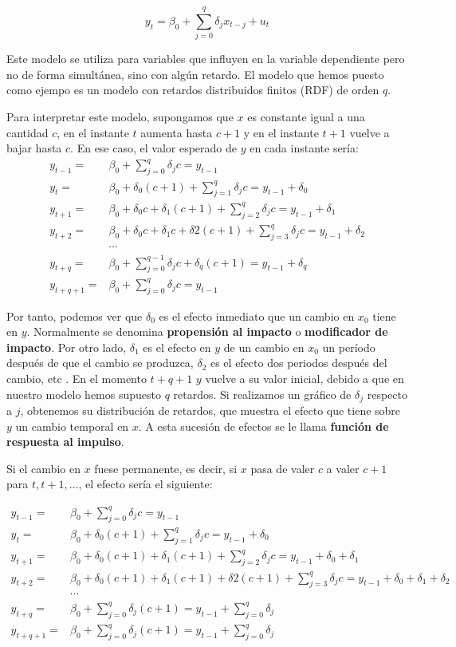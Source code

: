 \[ y_t=\beta_0+\sum_{j=0}^{q}\delta_jx_{t-j}+u_t\]

Este modelo se utiliza para variables que influyen en la variable dependiente pero no de forma simult\'anea, sino con alg\'un retardo. El modelo que hemos puesto como ejempo es un modelo con retardos distribuidos finitos (RDF) de orden $q$.

Para interpretar este modelo, supongamos que $x$ es constante igual a una cantidad $c$, en  el instante  $t$ aumenta hasta $c+1$ y en el instante $t+1$ vuelve a bajar hasta $c$. En ese caso, el valor esperado de $y$ en cada instante ser\'ia:
\begin{align*}
 y_{t-1}=&\beta_0+\sum_{j=0}^{q}\delta_jc = y_{t-1} \\
 y_{t}=&\beta_0+\delta_0(c+1)+\sum_{j=1}^{q}\delta_jc = y_{t-1}+\delta_0 \\
 y_{t+1}=&\beta_0+\delta_0c+\delta_1(c+1)+\sum_{j=2}^{q}\delta_jc = y_{t-1}+\delta_1 \\
 y_{t+2}=&\beta_0+\delta_0c+\delta_1c+\delta2(c+1)+\sum_{j=3}^{q}\delta_jc = y_{t-1}+\delta_2 \\
 &\cdots \\
 y_{t+q}=&\beta_0+\sum_{j=0}^{q-1}\delta_jc+\delta_q(c+1) = y_{t-1} +\delta_q\\
  y_{t+q+1}=&\beta_0+\sum_{j=0}^{q}\delta_jc = y_{t-1}
\end{align*}

Por tanto, podemos ver que $\delta_0$ es el efecto inmediato que un cambio en $x_0$ tiene en $y$. Normalmente se denomina \textbf{propensi\'on al impacto} o \textbf{modificador de impacto}. Por otro lado, $\delta_1$ es el efecto en $y$ de un cambio en $x_0$ un per\'iodo despu\'es de que el cambio se produzca, $\delta_2$ es el efecto dos periodos despu\'es del cambio, etc . En el momento $t+q+1$ $y$ vuelve a su valor inicial, debido a que en nuestro modelo hemos supuesto $q$ retardos. Si realizamos un gr\'afico de $\delta_j$ respecto a $j$, obtenemos su distribuci\'on de retardos, que muestra el efecto que tiene sobre $y$ un cambio temporal en $x$. A esta sucesi\'on de efectos se le llama \textbf{funci\'on de respuesta al impulso}.

Si el cambio en $x$ fuese permanente, es decir, si $x$ pasa de valer $c$ a valer $c+1$ para $t, t+1, \ldots$, el efecto ser\'ia el siguiente:

\begin{align*}
 y_{t-1}=&\beta_0+\sum_{j=0}^{q}\delta_jc = y_{t-1} \\
 y_{t}=&\beta_0+\delta_0(c+1)+\sum_{j=1}^{q}\delta_jc = y_{t-1}+\delta_0 \\
 y_{t+1}=&\beta_0+\delta_0(c+1)+\delta_1(c+1)+\sum_{j=2}^{q}\delta_jc = y_{t-1}+\delta_0+\delta_1 \\
 y_{t+2}=&\beta_0+\delta_0(c+1)+\delta_1(c+1)+\delta2(c+1)+\sum_{j=3}^{q}\delta_jc = y_{t-1}+\delta_0+\delta_1+\delta_2 \\
 &\cdots \\
 y_{t+q}=&\beta_0+\sum_{j=0}^{q}\delta_j(c+1) = y_{t-1}+\sum_{j=0}^{q}\delta_j \\
 y_{t+q+1}=&\beta_0+\sum_{j=0}^{q}\delta_j(c+1) = y_{t-1}+\sum_{j=0}^{q}\delta_j 
\end{align*}

